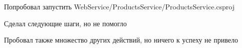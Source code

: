 \documentclass[a4paper,11pt]{article}
\begin{document}
Попробовал запустить WebService/ProductsService/ProductsService.csproj
\begin{center}
\label{fig:image}
\end{center}
Сделал следующие шаги, но не помогло
\begin{center}
\label{fig:image}
\end{center}
\begin{center}
\label{fig:image}
\end{center}
Пробовал также множество других действий, но ничего к успеху не привело 
\end{document}
